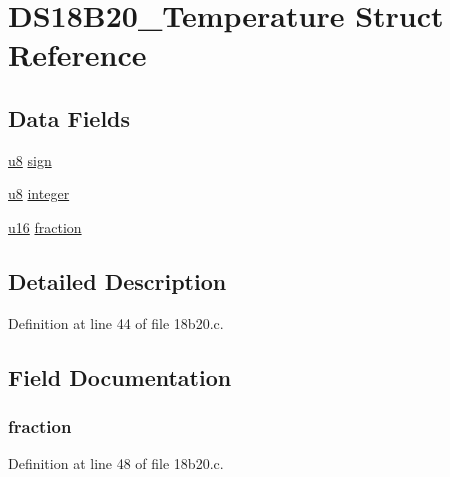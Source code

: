 \hypertarget{struct_d_s18_b20___temperature}{\section{D\-S18\-B20\-\_\-\-Temperature Struct Reference}
\label{struct_d_s18_b20___temperature}
}
\subsection*{Data Fields}
\begin{DoxyCompactItemize}
\item 
\hyperlink{p8_2pinguino_2core_2typedef_8h_aed742c436da53c1080638ce6ef7d13de}{u8} \hyperlink{struct_d_s18_b20___temperature_a3e169a2ae52e52b7b8a61c0edac0abf3}{sign}
\item 
\hyperlink{p8_2pinguino_2core_2typedef_8h_aed742c436da53c1080638ce6ef7d13de}{u8} \hyperlink{struct_d_s18_b20___temperature_a4782d1ad82c5fb6d8cc55c968e2811d7}{integer}
\item 
\hyperlink{p8_2pinguino_2core_2typedef_8h_a50b0d1c7a54fa09a64a3ac111c778520}{u16} \hyperlink{struct_d_s18_b20___temperature_a68eb408e37c7ea871beec15088138efa}{fraction}
\end{DoxyCompactItemize}


\subsection{Detailed Description}


Definition at line 44 of file 18b20.\-c.



\subsection{Field Documentation}
\hypertarget{struct_d_s18_b20___temperature_a68eb408e37c7ea871beec15088138efa}{
\subsubsection[{fraction}]{ fraction}}\label{struct_d_s18_b20___temperature_a68eb408e37c7ea871beec15088138efa}


Definition at line 48 of file 18b20.\-c.



